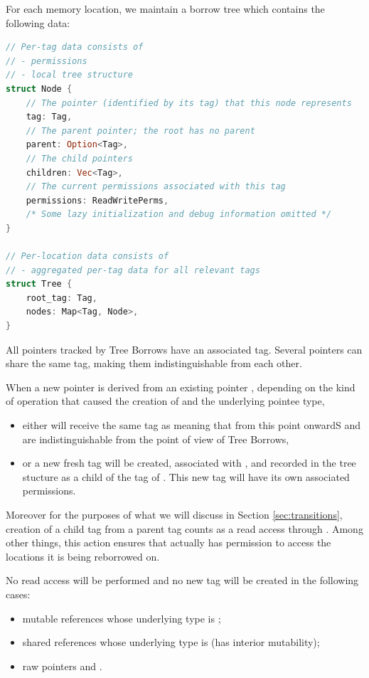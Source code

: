 \documentclass[a4paper,11pt]{article}
\theoremstyle{plain}
\theoremstyle{definition}
\theoremstyle{remark}
\newcommand{\tcode}[1]{\rstinline{#1}}
\begin{document}
For each memory location, we maintain a borrow tree which contains
the following data:
\begin{lstlisting}[language=rust]
// Per-tag data consists of
// - permissions
// - local tree structure
struct Node {
    // The pointer (identified by its tag) that this node represents
    tag: Tag,
    // The parent pointer; the root has no parent
    parent: Option<Tag>,
    // The child pointers
    children: Vec<Tag>,
    // The current permissions associated with this tag
    permissions: ReadWritePerms,
    /* Some lazy initialization and debug information omitted */
}

// Per-location data consists of
// - aggregated per-tag data for all relevant tags
struct Tree {
    root_tag: Tag,
    nodes: Map<Tag, Node>,
}
\end{lstlisting}

All pointers tracked by Tree Borrows have an associated tag. Several pointers
can share the same tag, making them indistinguishable from each other.

When a new pointer \tcode{y} is derived from an existing pointer \tcode{x}, depending
on the kind of operation that caused the creation of \tcode{y} and the underlying
pointee type,

\begin{itemize}
    \item either \tcode{y} will receive the same tag as \tcode{x} meaning that from this
        point onwardS \tcode{x} and \tcode{y} are indistinguishable from the point of view of Tree
        Borrows,
    \item or a new fresh tag will be created, associated with \tcode{y}, and recorded in the
        tree stucture as a child of the tag of \tcode{x}. This new tag will have its own
        associated permissions.
\end{itemize}

Moreover for the purposes of what we will discuss in Section \ref{sec:transitions}, creation of
a child tag \tcode{y} from a parent tag \tcode{x} counts as a read access through \tcode{y}.
Among other things, this action ensures that \tcode{y} actually has permission to
access the locations it is being reborrowed on.

No read access will be performed and no new tag will be created in the following
cases:
\begin{itemize}
    \item mutable references \tcode{\&mut} whose underlying type is \tcode{!Unpin};
    \item shared references \tcode{\&} whose underlying type is \tcode{!Freeze} (has interior mutability);
    \item raw pointers \tcode{*mut} and \tcode{*const}.
\end{itemize}
\end{document}
